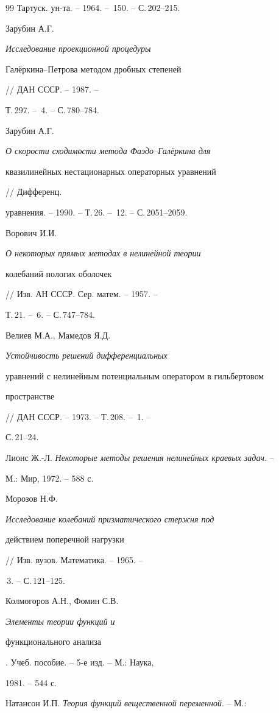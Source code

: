 \begin{thebibliography}{99}
Тартуск. ун-та. -- 1964. -- \No\,150. -- С.\,202--215. 




Зарубин А.Г. {\em Исследование проекционной процедуры 


Гал\"еркина--Петрова методом дробных степеней} // ДАН СССР. -- 1987. -- 


Т.\,297. -- \No\,4. -- С.\,780--784. 




Зарубин А.Г. {\em О скорости сходимости метода Фаэдо--Гал\"еркина для 


квазилинейных нестационарных операторных уравнений} // Дифференц. 


уравнения. -- 1990. -- Т.\,26. -- \No\,12. -- С.\,2051--2059. 




Ворович И.И. {\em О некоторых прямых методах в нелинейной теории 


колебаний пологих оболочек} // Изв. АН СССР. Сер. матем. -- 1957. -- 


Т.\,21. -- \No\,6. -- С.\,747--784. 




Велиев М.А., Мамедов Я.Д. {\em Устойчивость решений дифференциальных 


уравнений с нелинейным потенциальным оператором в гильбертовом 


пространстве} // ДАН СССР. -- 1973. -- Т.\,208. -- \No\,1. -- 


С.\,21--24. 




Лионс Ж.-Л. {\em Некоторые методы решения нелинейных краевых задач}. -- 


М.: Мир, 1972. -- 588 с. 




Морозов Н.Ф. {\em Исследование колебаний призматического стержня под 


действием поперечной нагрузки} // Изв. вузов. Математика. -- 1965. -- 


\No\,3. -- С.\,121--125. 




Колмогоров А.Н., Фомин С.В. {\em Элементы теории функций и 


функционального анализа}. Учеб. пособие. -- 5-е изд. -- М.: Наука, 


1981. -- 544 с. 




Натансон И.П. {\em Теория функций вещественной переменной}. -- М.: 



\end{thebibliography}
